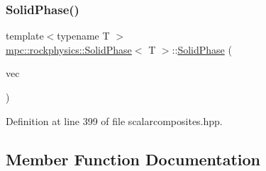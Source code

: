 \subsubsection{\texorpdfstring{Solid\+Phase()}{SolidPhase()}}
{\footnotesize\ttfamily template$<$typename T $>$ \\
\mbox{\hyperlink{classmpc_1_1rockphysics_1_1_solid_phase}{mpc\+::rockphysics\+::\+Solid\+Phase}}$<$ T $>$\+::\mbox{\hyperlink{classmpc_1_1rockphysics_1_1_solid_phase}{Solid\+Phase}} (\begin{DoxyParamCaption}\item[{const std\+::vector$<$ std\+::tuple$<$ \mbox{\hyperlink{structmpc_1_1rockphysics_1_1_bulk_modulus_type}{mpc\+::rockphysics\+::\+Bulk\+Modulus\+Type}}$<$ T $>$, \mbox{\hyperlink{structmpc_1_1rockphysics_1_1_shear_modulus_type}{mpc\+::rockphysics\+::\+Shear\+Modulus\+Type}}$<$ T $>$, \mbox{\hyperlink{structmpc_1_1rockphysics_1_1_density_type}{mpc\+::rockphysics\+::\+Density\+Type}}$<$ T $>$, \mbox{\hyperlink{structmpc_1_1rockphysics_1_1_volume_fraction_type}{mpc\+::rockphysics\+::\+Volume\+Fraction\+Type}}$<$ T $>$ $>$ $>$ \&}]{vec }\end{DoxyParamCaption})\hspace{0.3cm}{\ttfamily [inline]}}



Definition at line 399 of file scalarcomposites.\+hpp.



\subsection{Member Function Documentation}
\mbox{\label{classmpc_1_1rockphysics_1_1_solid_phase_ae8dbd8e5777a51515f84f6fb7e87ba97}} 
